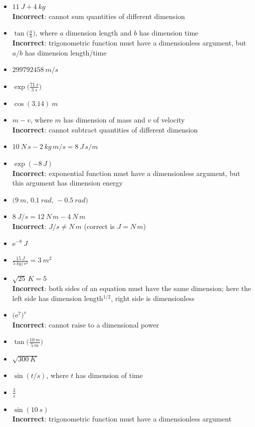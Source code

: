 \documentclass[a4paper,12pt,%
onecolumn,oneside,%
british%
]{memoir}
\newcommand*{\e}{\ensuremath{\mathrm{e}}}
\renewcommand*{\|}[1][]{\nonscript\:#1\vert\nonscript\:\mathopen{}}
\begin{document}
\begin{itemize}[label=$\triangleright$\enspace,itemsep=1ex]
\item $\displaystyle\qty{11}{J} + \qty{4}{kg}$\\%
  \textbf{Incorrect}: cannot sum quantities of different dimension
\item $\displaystyle\tan\biggl(\frac{a}{b}\biggr)$, where $a$ dimension \textsf{length} and $b$ has dimension \textsf{time}\\%
  \textbf{Incorrect}: trigonometric function must have a dimensionless argument, but $a/b$ has dimension \textsf{length}/\textsf{time}
\item $\displaystyle\qty{299792458}{m/s}$
\item $\displaystyle\exp\biggl(\frac{\qty{71}{s}}{\qty{3}{s}}\biggr)$
\item $\displaystyle\cos(\num{3.14})\:\unit{m}$
\item $\displaystyle m - v$, where $m$ has dimension of \textsf{mass} and $v$ of \textsf{velocity}\\%
  \textbf{Incorrect}: cannot subtract quantities of different dimension
\item $\displaystyle \qty{10}{N\, s}-\qty{2}{kg\, m/s} = \qty{8}{J\, s/m}$
\item $\displaystyle\exp(-8\,\unit{J})$\\%
  \textbf{Incorrect}: exponential function must have a dimensionless argument, but this argument has dimension \textsf{energy}
\item $\displaystyle\bigl(\qty{9}{m},\, \qty{0.1}{rad},\, -\qty{0.5}{rad}\bigr)$
\item $\displaystyle\qty{8}{J/s}=\qty{12}{N\,m}-\qty{4}{N\,m}$\\%
  \textbf{Incorrect}: $\unit{J/s} \ne \unit{N\,m}$ (correct is $\unit{J} = \unit{N\,m}$)
\item $\displaystyle\e^{-8}\:\unit{J}$
\item $\displaystyle\frac{\qty{15}{J}}{\qty{5}{kg/s^{2}}} = \qty{3}{m^{2}}$
\item $\displaystyle \sqrt{25}\,\unit{K} = 5$\\%
  \textbf{Incorrect}: both sides of an equation must have the same dimension; here the left side has dimension \textsf{length}${}^{1/2}$, right side is dimensionless
\item $\displaystyle\bigl(\e^{7}\bigr)^{\unit{s}}$\\%
  \textbf{Incorrect}: cannot raise to a dimensional power
\item $\displaystyle\tan\biggl(\frac{\qty{10}{m}}{\qty{5}{m}}\biggr)$
\item $\displaystyle\sqrt{\qty{300}{K}\,}$
\item $\displaystyle\sin(t/\unit{s})$, where $t$ has dimension of \textsf{time}
\item $\displaystyle\frac{3}{\unit{s}}$
\item $\displaystyle\sin(\qty{10}{s})$\\%
  \textbf{Incorrect}: trigonometric function must have a dimensionless argument
\end{itemize}
\end{document}
